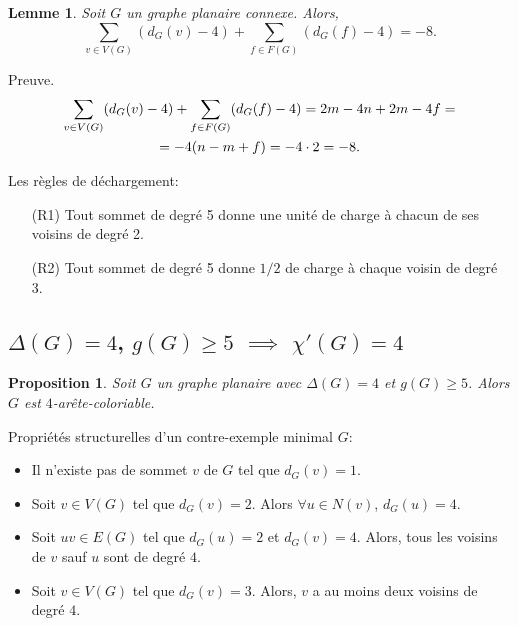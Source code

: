 \documentclass{beamer}
\newtheorem{lemme}{Lemme}
\newtheorem{proposition}{Proposition}
\begin{document}
\begin{frame}
\begin{lemme}
Soit $G$ un graphe planaire connexe. Alors,
$$ \sum_{v \in V(G)} (d_G(v) - 4) + \sum_{f\in F(G)} (d_G(f) -4) = -8.$$
\end{lemme}
Preuve.
$$
\gathered 
\sum_{v \in V(G)} (d_G(v) - 4) + \sum_{f\in F(G)} (d_G(f) -4) = 2m -4n + 2m - 4f = \\
 =-4(n - m + f) = -4\cdot 2 = -8.
\endgathered
$$
\end{frame}

\begin{frame}
Les règles de déchargement:
\begin{enumerate}
\item[(R1)] Tout sommet de degré 5 donne une unité de charge à chacun de ses voisins de degré 2.
\item[(R2)] Tout sommet de degré 5 donne $1/2$ de charge à chaque voisin de degré 3.
\end{enumerate}
\end{frame}

\subsection{$\Delta(G)=4$, $g(G)\geq 5$ $\implies$ $\chi'(G)=4$}
\begin{frame}
\begin{proposition}
Soit $G$ un graphe planaire avec $\Delta(G) = 4$ et $g(G) \geq 5$. Alors $G$ est $4$-arête-coloriable.
\end{proposition}
Propriétés structurelles d'un contre-exemple minimal $G$:
\begin{itemize}
\item Il n'existe pas de sommet $v$ de $G$ tel que $d_G(v) = 1$.
\item Soit $v \in V(G)$ tel que $d_G(v) = 2$. Alors $\forall u \in N(v)$, $d_G(u) = 4$.
\item Soit $uv \in E(G)$ tel que $d_G(u) = 2$ et $d_G(v) = 4$. Alors, tous les voisins de $v$ sauf $u$ sont de degré $4$.
\item Soit $v \in V(G)$ tel que $d_G(v)=3$. Alors, $v$ a au moins deux voisins de degré $4$.
\end{itemize}
\end{frame}
\end{document}
